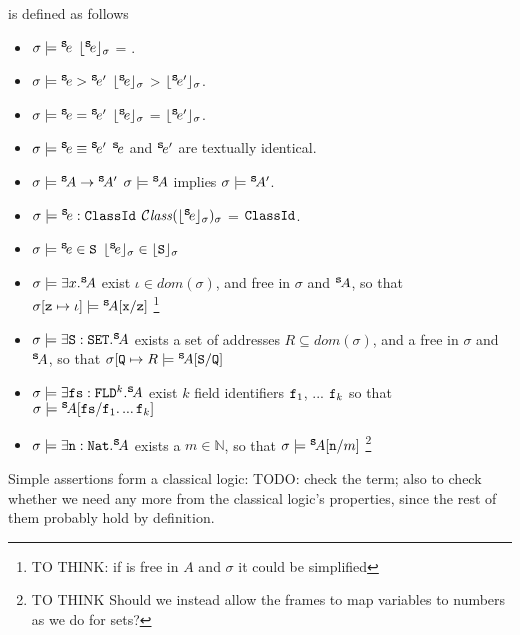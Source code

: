  \begin{definition} is defined  as follows

\begin{itemize}
\item
$\sigma \models \SE$ \IFF  $\interp{\SE}{\sigma}$ = .
\item
$\sigma \models \SE>\SEPrime$ \IFF $\interp{\SE}{\sigma}$ > $\interp{\SEPrime}{\sigma}$.
\item
$\sigma \models \SE=\SEPrime$ \IFF $\interp{\SE}{\sigma}$ = $\interp{\SEPrime}{\sigma}$.
\item
$\sigma \models \SE\equiv\SEPrime$ \IFF $\SE$ and $\SEPrime$ are textually identical.
\item
$\sigma \models \SA \rightarrow \SAPrime $ \IFF $\sigma \models \SA$ implies $\sigma \models \SAPrime$. 
\item
$\sigma \models  \SE:\prg{ClassId}$ \IFF $\ClassOf {\interp{\SE}{\sigma}} {\sigma}$ = $\prg{ClassId}$.
\item
$\sigma \models  \SE\in \prg{S}$ \IFF $\interp{\SE}{\sigma}\in \interp{\prg{S}}{\sigma}$
\item
$\sigma \models  \exists x.\SA$ \IFF  exist  $\iota\in dom(\sigma)$, and    free in $\sigma$ and $\SA$, so that
$\sigma[\prg{z}\mapsto \iota] \models  \SA[\prg{x}/\prg{z}]$ \footnote{TO THINK: if  is free in $A$ and $\sigma$ it could be simplified}
\item
$\sigma \models  \exists \prg{S}:\prg{SET}.\SA$ \IFF  exists a set of addresses $R\subseteq dom(\sigma)$, and a  free in $\sigma$ and $\SA$, so that
$\sigma[\prg{Q}\mapsto R \models  \SA[\prg{S}/\prg{Q}]$ 
\item
$\sigma \models  \exists \prg{fs}:\prg{FLD}^k.\SA$ \IFF  exist $k$ field identifiers $\prg{f}_1$, ... $\prg{f}_k$ so that 
$\sigma \models  \SA[\prg{fs}/\prg{f}_1.\,...\,\prg{f}_k]$ 
\item
$\sigma \models  \exists \prg{n}:\prg{Nat}.\SA$ \IFF  exists a $m\in\mathbb{N}$, so that $\sigma \models    \SA[\prg{n}/m]$ 
\footnote{TO THINK Should we instead allow the frames to map variables to numbers as we do for sets?}
\end{itemize}
\end{definition}

Simple assertions form a classical logic: TODO: check the term; also to check whether we need any more from the classical logic's properties, since the rest of them probably hold by definition.

